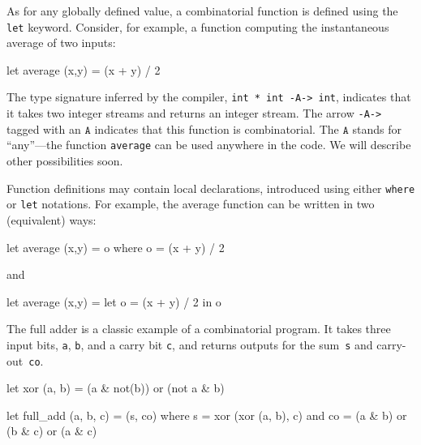 \documentclass[11pt,titlepage,twoside]{report}
\makeatletter
\newcommand{\zls}[1]{{\@span{class="zelusinline"}#1}}
\newcommand{\zls}[1]{\texttt{#1}}
\renewcommand{\zls}[1]{\texttt{#1}}
\newcommand{\zlsmsg}[1]{\texttt{#1}}
\newcommand{\AnyKind}{\ensuremath{\mathtt{A}}}
\makeatother
\begin{document}
As for any globally defined value, a combinatorial function
is defined using the \zls{let} keyword.
Consider, for example, a function computing the
instantaneous average of two inputs:
\begin{chklisting}[withresult]
let average (x,y) = (x + y) / 2
\end{chklisting}
The type signature inferred by the compiler, \zlsmsg{int * int -A-> int},
indicates that it takes two integer streams and returns an integer stream.
The arrow \texttt{-A->} tagged with an \AnyKind{} indicates that this 
function is combinatorial.
The \AnyKind{} stands for ``any''---the function \zls{average} can be used 
anywhere in the code.
We will describe other possibilities soon.

Function definitions may contain local declarations, introduced using
either \zls{where} or \zls{let} notations. For example, the average function 
can be written in two (equivalent) ways:
\begin{chklisting}
let average (x,y) = o where o = (x + y) / 2
\end{chklisting}
and
\begin{chklisting}
let average (x,y) = let o = (x + y) / 2 in o
\end{chklisting}

The full adder is a classic example of a combinatorial program.
It takes three input bits, \zls{a}, \zls{b}, and a carry bit \zls{c}, and 
returns outputs for the sum~\zls{s} and carry-out~\zls{co}.
\begin{chklisting}[withresult,label=xor]
let xor (a, b) = (a & not(b)) or (not a & b)

let full_add (a, b, c) = (s, co) where
       s = xor (xor (a, b), c)
   and co = (a & b) or (b & c) or (a & c)
\end{chklisting}
\end{document}
